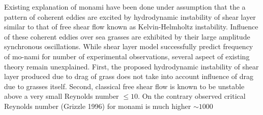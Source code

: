 \documentclass[aps,preprint,floatfix,prl]{revtex4-1}
\begin{document}
Existing explanation of monami have been done under assumption that the a pattern of coherent eddies are excited by hydrodynamic instability of shear layer
similar to that of free shear flow known as Kelvin-Helmholtz instability. Influence of these coherent eddies over sea grasses are exhibited by their large amplitude synchronous 
oscillations.
\newline
While shear layer model successfully predict frequency of mo-nami for number of experimental observations,
several aspect of existing theory remain unexplained. First, the proposed hydrodynamic instability of shear layer produced due to drag of 
grass does not take into account influence of drag due to grasses itself. 
Second, classical free shear flow is known to be unstable above a very small Reynolds number $\leq 10 $. On the contrary observed critical Reynolds number (Grizzle 1996) for monami is much
higher $\sim 1000$
\end{document}
